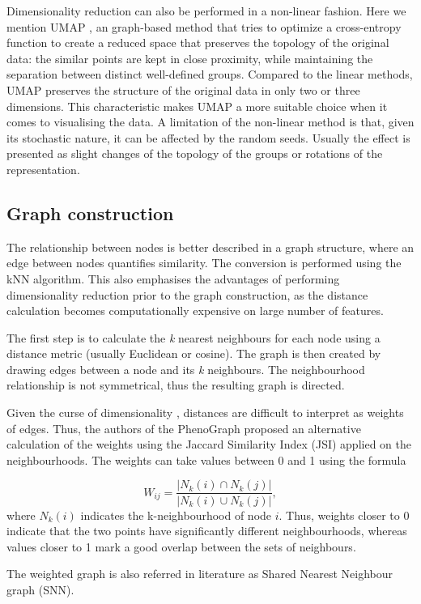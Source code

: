 Dimensionality reduction can also be performed in a non-linear fashion. Here we mention UMAP \cite{mcinnes2018uniform}, an graph-based method that tries to optimize a cross-entropy function to create a reduced space that preserves the topology of the original data: the similar points are kept in close proximity, while maintaining the separation between distinct well-defined groups. Compared to the linear methods, UMAP preserves the structure of the original data in only two or three dimensions. This characteristic makes UMAP a more suitable choice when it comes to visualising the data. A limitation of the non-linear method is that, given its stochastic nature, it can be affected by the random seeds. Usually the effect is presented as slight changes of the topology of the groups or rotations of the representation.

\subsection{Graph construction}
The relationship between nodes is better described in a graph structure, where an edge between nodes quantifies similarity. The conversion is performed using the kNN algorithm. This also emphasises the advantages of performing dimensionality reduction prior to the graph construction, as the distance calculation becomes computationally expensive on large number of features.
    
The first step is to calculate the \textit{k} nearest neighbours for each node using a distance metric (usually Euclidean or cosine). The graph is then created by drawing edges between a node and its \textit{k} neighbours. The neighbourhood relationship is not symmetrical, thus the resulting graph is directed. 
    
Given the curse of dimensionality \cite{Altman2018}, distances are difficult to interpret as weights of edges. Thus, the authors of the PhenoGraph proposed an alternative calculation of the weights using the Jaccard Similarity Index (JSI) applied on the neighbourhoods. The weights can take values between 0 and 1 using the formula 
    
\[ W_{ij} = \frac{|N_k(i) \cap N_k(j)|}{|N_k(i) \cup N_k(j)|}, \] where $N_k(i)$ indicates the k-neighbourhood of node $i$. Thus, weights closer to 0 indicate that the two points have significantly different neighbourhoods, whereas values closer to 1 mark a good overlap between the sets of neighbours.

The weighted graph is also referred in literature as Shared Nearest Neighbour graph (SNN).
    
